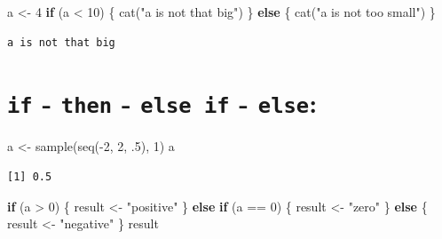 \documentclass[
]{book}
\newenvironment{Shaded}{\begin{snugshade}}{\end{snugshade}}
\newcommand{\ControlFlowTok}[1]{\textcolor[rgb]{0.13,0.29,0.53}{\textbf{#1}}}
\newcommand{\DecValTok}[1]{\textcolor[rgb]{0.00,0.00,0.81}{#1}}
\newcommand{\FunctionTok}[1]{\textcolor[rgb]{0.00,0.00,0.00}{#1}}
\newcommand{\NormalTok}[1]{#1}
\newcommand{\OtherTok}[1]{\textcolor[rgb]{0.56,0.35,0.01}{#1}}
\newcommand{\SpecialCharTok}[1]{\textcolor[rgb]{0.00,0.00,0.00}{#1}}
\newcommand{\StringTok}[1]{\textcolor[rgb]{0.31,0.60,0.02}{#1}}
\begin{document}
\begin{Shaded}
\begin{Highlighting}[]
\NormalTok{a }\OtherTok{\textless{}{-}} \DecValTok{4}
\ControlFlowTok{if}\NormalTok{ (a }\SpecialCharTok{\textless{}} \DecValTok{10}\NormalTok{) \{}
  \FunctionTok{cat}\NormalTok{(}\StringTok{"a is not that big"}\NormalTok{)}
\NormalTok{\} }\ControlFlowTok{else}\NormalTok{ \{}
  \FunctionTok{cat}\NormalTok{(}\StringTok{"a is not too small"}\NormalTok{)}
\NormalTok{\}}
\end{Highlighting}
\end{Shaded}

\begin{verbatim}
a is not that big
\end{verbatim}

\hypertarget{if---then---else-if---else}{%
\section{\texorpdfstring{\texttt{if} - \texttt{then} - \texttt{else\ if} - \texttt{else}:}{if - then - else if - else:}}\label{if---then---else-if---else}}

\begin{Shaded}
\begin{Highlighting}[]
\NormalTok{a }\OtherTok{\textless{}{-}} \FunctionTok{sample}\NormalTok{(}\FunctionTok{seq}\NormalTok{(}\SpecialCharTok{{-}}\DecValTok{2}\NormalTok{, }\DecValTok{2}\NormalTok{, .}\DecValTok{5}\NormalTok{), }\DecValTok{1}\NormalTok{)}
\NormalTok{a}
\end{Highlighting}
\end{Shaded}

\begin{verbatim}
[1] 0.5
\end{verbatim}

\begin{Shaded}
\begin{Highlighting}[]
\ControlFlowTok{if}\NormalTok{ (a }\SpecialCharTok{\textgreater{}} \DecValTok{0}\NormalTok{) \{}
\NormalTok{  result }\OtherTok{\textless{}{-}} \StringTok{"positive"}
\NormalTok{\} }\ControlFlowTok{else} \ControlFlowTok{if}\NormalTok{ (a }\SpecialCharTok{==} \DecValTok{0}\NormalTok{) \{}
\NormalTok{  result }\OtherTok{\textless{}{-}} \StringTok{"zero"}
\NormalTok{\} }\ControlFlowTok{else}\NormalTok{ \{}
\NormalTok{  result }\OtherTok{\textless{}{-}} \StringTok{"negative"}
\NormalTok{\}}
\NormalTok{result}
\end{Highlighting}
\end{Shaded}
\end{document}
